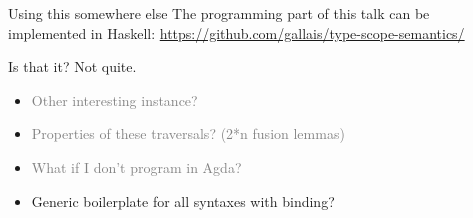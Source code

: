 \documentclass[xetex, mathserif, serif]{beamer}
\begin{document}
  \begin{frame}{Using this somewhere else}
    The programming part of this talk can be implemented in Haskell:
    {\small\url{https://github.com/gallais/type-scope-semantics/}}
  \end{frame}

  \begin{frame}{Is that it? Not quite.}
    \begin{itemize}
      \item \textcolor{gray}{Other interesting instance?}
      \item \textcolor{gray}{Properties of these traversals? (2*n fusion lemmas)}
      \item \textcolor{gray}{What if I don't program in Agda?}
      \item Generic boilerplate for all syntaxes with binding?
    \end{itemize}
  \end{frame}
\end{document}
